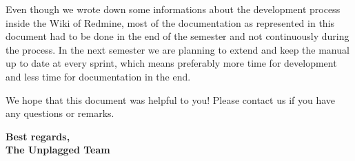 Even though we wrote down some informations about the development process inside the Wiki of Redmine, most of the 
documentation as 
represented in this document had to be 
done in the end of the semester and not continuously during the process. 
In the next semester we are planning to extend and keep the manual up to date at every sprint, which means preferably 
more time for development and less time for documentation in the end.

We hope that this document was helpful to you! Please contact us if you have any questions or remarks.

\large 
\textbf{Best regards, \\
The Unplagged Team}